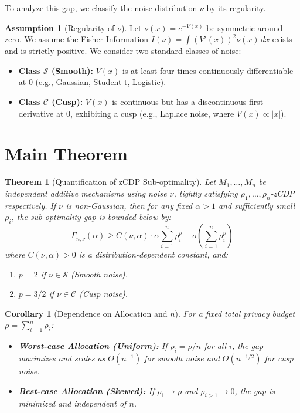 \documentclass[11pt]{article}
\newtheorem{theorem}{Theorem}
\newtheorem{corollary}{Corollary}
\theoremstyle{definition}
\newtheorem{assumption}{Assumption}
\begin{document}
To analyze this gap, we classify the noise distribution $\nu$ by its regularity.

\begin{assumption}[Regularity of $\nu$]
Let $\nu(x) = e^{-V(x)}$ be symmetric around zero. We assume the Fisher Information $I(\nu) = \int (V'(x))^2 \nu(x) \,dx$ exists and is strictly positive. We consider two standard classes of noise:
\begin{itemize}
    \item \textbf{Class $\mathcal{S}$ (Smooth):} $V(x)$ is at least four times continuously differentiable at $0$ (e.g., Gaussian, Student-t, Logistic).
    \item \textbf{Class $\mathcal{C}$ (Cusp):} $V(x)$ is continuous but has a discontinuous first derivative at $0$, exhibiting a cusp (e.g., Laplace noise, where $V(x) \propto |x|$).
\end{itemize}
\end{assumption}

\section{Main Theorem}

\begin{theorem}[Quantification of zCDP Sub-optimality]
Let $M_1, \dots, M_n$ be independent additive mechanisms using noise $\nu$, tightly satisfying $\rho_1, \dots, \rho_n$-zCDP respectively. If $\nu$ is non-Gaussian, then for any fixed $\alpha > 1$ and sufficiently small $\rho_i$, the sub-optimality gap is bounded below by:
\[
\Gamma_{n,\nu}(\alpha) \ge C(\nu, \alpha) \cdot \alpha \sum_{i=1}^n \rho_i^p + o\left(\sum_{i=1}^n \rho_i^p\right)
\]
where $C(\nu, \alpha) > 0$ is a distribution-dependent constant, and:
\begin{enumerate}
    \item $p = 2$ if $\nu \in \mathcal{S}$ (Smooth noise).
    \item $p = 3/2$ if $\nu \in \mathcal{C}$ (Cusp noise).
\end{enumerate}
\end{theorem}

\begin{corollary}[Dependence on Allocation and $n$]
For a fixed total privacy budget $\rho = \sum_{i=1}^n \rho_i$:
\begin{itemize}
    \item \textbf{Worst-case Allocation (Uniform):} If $\rho_i = \rho / n$ for all $i$, the gap maximizes and scales as $\Theta(n^{-1})$ for smooth noise and $\Theta(n^{-1/2})$ for cusp noise.
    \item \textbf{Best-case Allocation (Skewed):} If $\rho_1 \to \rho$ and $\rho_{i>1} \to 0$, the gap is minimized and independent of $n$.
\end{itemize}
\end{corollary}
\end{document}
